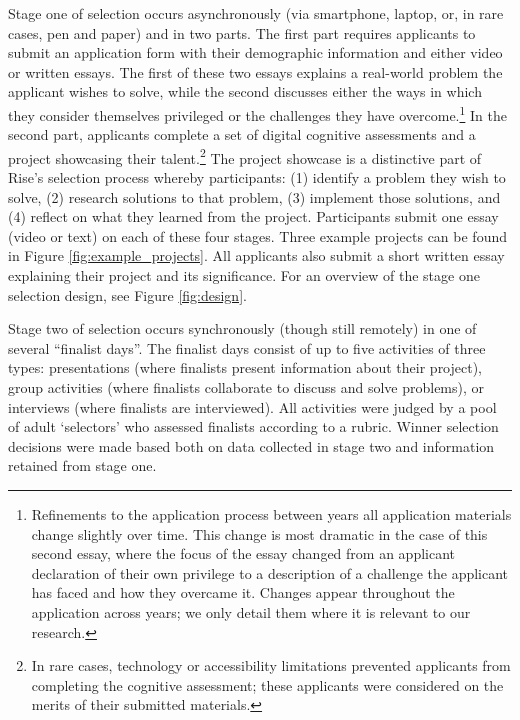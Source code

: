 Stage one of selection occurs asynchronously (via smartphone, laptop, or, in rare cases, pen and paper) and in two parts. The first part requires applicants to submit an application form with their demographic information and either video or written essays. The first of these two essays explains a real-world problem the applicant wishes to solve, while the second discusses either the ways in which they consider themselves privileged or the challenges they have overcome.\footnote{Refinements to the application process between years all application materials change slightly over time. This change is most dramatic in the case of this second essay, where the focus of the essay changed from an applicant declaration of their own privilege to a description of a challenge the applicant has faced and how they overcame it. Changes appear throughout the application across years; we only detail them where it is relevant to our research.} In the second part, applicants complete a set of digital cognitive assessments and a project showcasing their talent.\footnote{In rare cases, technology or accessibility limitations prevented applicants from completing the cognitive assessment; these applicants were considered on the merits of their submitted materials.} The project showcase is a distinctive part of Rise's selection process whereby participants: (1) identify a problem they wish to solve, (2) research solutions to that problem, (3) implement those solutions, and (4) reflect on what they learned from the project. Participants submit one essay (video or text) on each of these four stages. Three example projects can be found in Figure \ref{fig:example_projects}. All applicants also submit a short written essay explaining their project and its significance. For an overview of the stage one selection design, see Figure \ref{fig:design}.

Stage two of selection occurs synchronously (though still remotely) in one of several ``finalist days''. The finalist days consist of up to five activities of three types: presentations (where finalists present information about their project), group activities (where finalists collaborate to discuss and solve problems), or interviews (where finalists are interviewed). All activities were judged by a pool of adult `selectors' who assessed finalists according to a rubric. Winner selection decisions were made based both on data collected in stage two and information retained from stage one.

